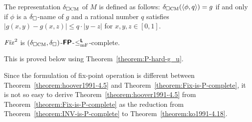 \documentclass[envcountsame,orivec,oribibl]{llncs}
\begin{document}
The representation $\delta _{\square \mathrm{CM}}$ of $M$ is defined as follows:
$\delta _{\square \mathrm{CM}}(\langle \phi, q \rangle) = g$ if and only if
$\phi$ is a $\delta _\square$-name of $g$ and a rational number $q$ satisfies 
$|g(x, y) - g(x, z)| \le q \cdot |y - z|$ for  $x, y, z \in [0,1]$.

\begin{theorem}
 \label{theorem:Fix-is-P-complete}
 $\mathit{Fix}^2$ is $(\delta _{\square \mathrm{CM}}, \delta _\square)$-$\text{\bfseries \sffamily \upshape FP}$-$\leq _{\mathrm{mF}} ^{\text{\bfseries \sffamily \upshape L}}$-complete. 
\end{theorem}

This is proved below using Theorem~\ref{theorem:P-hard-g_u}. 

Since the formulation of fix-point operation is different between 
Theorem~\ref{theorem:hoover1991-4.5} and Theorem~\ref{theorem:Fix-is-P-complete},
it is not so easy to derive Theorem~\ref{theorem:hoover1991-4.5} from
Theorem~\ref{theorem:Fix-is-P-complete} as the reduction from 
Theorem~\ref{theorem:INV-is-P-complete} to Theorem~\ref{theorem:ko1991-4.18}.
\end{document}
